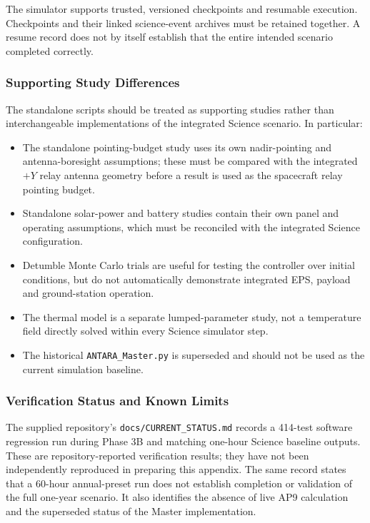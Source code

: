 The simulator supports trusted, versioned checkpoints and resumable execution. Checkpoints and their linked science-event archives must be retained together. A resume record does not by itself establish that the entire intended scenario completed correctly.

\subsubsection{Supporting Study Differences}
\label{app:study-differences}
The standalone scripts should be treated as supporting studies rather than interchangeable implementations of the integrated Science scenario. In particular:
\begin{itemize}
\item The standalone pointing-budget study uses its own nadir-pointing and antenna-boresight assumptions; these must be compared with the integrated $+Y$ relay antenna geometry before a result is used as the spacecraft relay pointing budget.
\item Standalone solar-power and battery studies contain their own panel and operating assumptions, which must be reconciled with the integrated Science configuration.
\item Detumble Monte Carlo trials are useful for testing the controller over initial conditions, but do not automatically demonstrate integrated EPS, payload and ground-station operation.
\item The thermal model is a separate lumped-parameter study, not a temperature field directly solved within every Science simulator step.
\item The historical \texttt{ANTARA\_Master.py} is superseded and should not be used as the current simulation baseline.
\end{itemize}

\subsubsection{Verification Status and Known Limits}
\label{app:model-limits}
The supplied repository's \texttt{docs/CURRENT\_STATUS.md} records a 414-test software regression run during Phase 3B and matching one-hour Science baseline outputs. These are repository-reported verification results; they have not been independently reproduced in preparing this appendix. The same record states that a 60-hour annual-preset run does not establish completion or validation of the full one-year scenario. It also identifies the absence of live AP9 calculation and the superseded status of the Master implementation.

